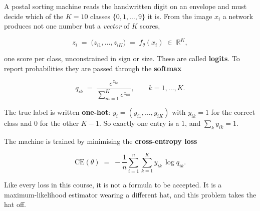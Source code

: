 \documentclass[11pt,a4paper]{article}
\begin{document}
A postal sorting machine reads the handwritten digit on an envelope and must
decide which of the $K = 10$ classes $\{0,1,\dots,9\}$ it is. From the image
$x_i$ a network produces not one number but a \emph{vector} of $K$ scores,

\[
  z_i \;=\; \big(z_{i1}, \dots, z_{iK}\big) \;=\; f_\theta(x_i) \;\in\; \mathbb{R}^{K},
\]

one score per class, unconstrained in sign or size. These are called
\textbf{logits}. To report probabilities they are passed through the
\textbf{softmax}

\[
  q_{ik} \;=\; \frac{e^{z_{ik}}}{\sum_{m=1}^{K} e^{z_{im}}},
  \qquad k = 1,\dots,K .
\]

The true label is written \textbf{one-hot}: $y_i = (y_{i1},\dots,y_{iK})$ with
$y_{ik} = 1$ for the correct class and $0$ for the other $K-1$. So exactly one
entry is a $1$, and $\sum_k y_{ik} = 1$.

The machine is trained by minimising the \textbf{cross-entropy loss}

\[
  \mathrm{CE}(\theta) \;=\; -\frac{1}{n}\sum_{i=1}^{n}\sum_{k=1}^{K}
    y_{ik}\,\log q_{ik} .
\]

Like every loss in this course, it is not a formula to be accepted. It is a
maximum-likelihood estimator wearing a different hat, and this problem takes the
hat off.
\end{document}
